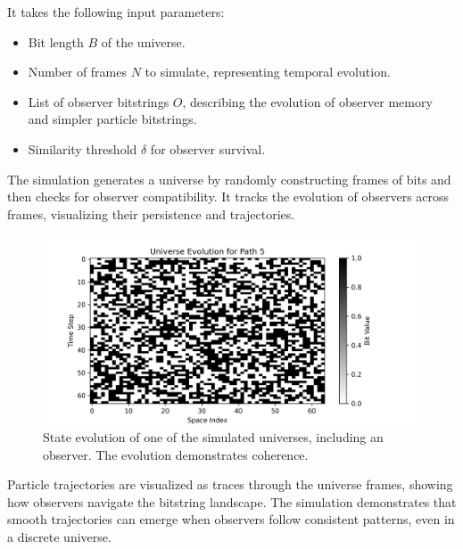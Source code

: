 \documentclass[12pt]{article}
\begin{document}
It takes the following input parameters:

\begin{itemize}
    \item Bit length $B$ of the universe.
    \item Number of frames $N$ to simulate, representing temporal evolution.
    \item List of observer bitstrings $O$, describing the evolution of observer memory and simpler particle bitstrings.
    \item Similarity threshold $\delta$ for observer survival.
\end{itemize}

The simulation generates a universe by randomly constructing frames of bits and then checks for observer compatibility. It tracks the evolution of observers across frames, visualizing their persistence and trajectories.

\begin{figure}[h!]
    \centering
    \includegraphics[width=1.0\textwidth]{figures/state_evolution_heatmap.png}
    \caption{State evolution of one of the simulated universes, including an observer. The evolution demonstrates coherence.}
    \label{fig:state_evolution}
\end{figure}

Particle trajectories are visualized as traces through the universe frames, showing how observers navigate the bitstring landscape. The simulation demonstrates that smooth trajectories can emerge when observers follow consistent patterns, even in a discrete universe.
\end{document}
